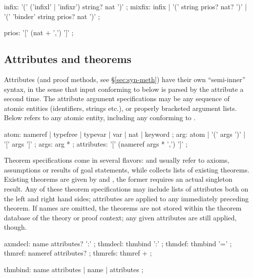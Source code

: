 \begin{rail}
  infix: '(' ('infixl' | 'infixr') string? nat ')'
  ;
  mixfix: infix | '(' string prios? nat? ')' | '(' 'binder' string prios? nat ')'
  ;

  prios: '[' (nat + ',') ']'
  ;
\end{rail}


\subsection{Attributes and theorems}\label{sec:syn-att}

Attributes (and proof methods, see \S\ref{sec:syn-meth}) have their own
``semi-inner'' syntax, in the sense that input conforming to
 below is parsed by the attribute a second time.  The
attribute argument specifications may be any sequence of atomic entities
(identifiers, strings etc.), or properly bracketed argument lists.  Below
 refers to any atomic entity, including any
 conforming to .

\begin{rail}
  atom: nameref | typefree | typevar | var | nat | keyword
  ;
  arg: atom | '(' args ')' | '[' args ']'
  ;
  args: arg *
  ;
  attributes: '[' (nameref args * ',') ']'
  ;
\end{rail}

Theorem specifications come in several flavors:  and
 usually refer to axioms, assumptions or results of goal
statements, while  collects lists of existing theorems.
Existing theorems are given by  and ,
the former requires an actual singleton result.  Any of these theorem
specifications may include lists of attributes both on the left and right hand
sides; attributes are applied to any immediately preceding theorem.  If names
are omitted, the theorems are not stored within the theorem database of the
theory or proof context; any given attributes are still applied, though.

\begin{rail}
  axmdecl: name attributes? ':'
  ;
  thmdecl: thmbind ':'
  ;
  thmdef: thmbind '='
  ;
  thmref: nameref attributes?
  ;
  thmrefs: thmref +
  ;

  thmbind: name attributes | name | attributes
  ;
\end{rail}



